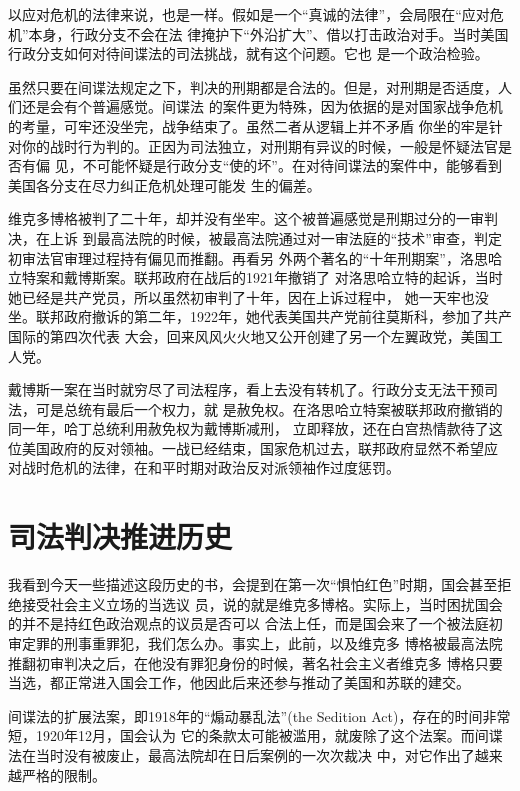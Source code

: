 \documentclass[10pt]{article}
\begin{document}
{以应对危机的法律来说，也是一样。假如是一个``真诚的法律''，会局限在``应对危机''本身，行政分支不会在法
律掩护下``外沿扩大''、借以打击政治对手。当时美国行政分支如何对待间谍法的司法挑战，就有这个问题。它也
是一个政治检验。

虽然只要在间谍法规定之下，判决的刑期都是合法的。但是，对刑期是否适度，人们还是会有个普遍感觉。间谍法
的案件更为特殊，因为依据的是对国家战争危机的考量，可牢还没坐完，战争结束了。虽然二者从逻辑上并不矛盾
\myrule 你坐的牢是针对你的战时行为判的。正因为司法独立，对刑期有异议的时候，一般是怀疑法官是否有偏
见，不可能怀疑是行政分支``使的坏''。在对待间谍法的案件中，能够看到美国各分支在尽力纠正危机处理可能发
生的偏差。

维克多\textperiodcentered 博格被判了二十年，却并没有坐牢。这个被普遍感觉是刑期过分的一审判决，在上诉
到最高法院的时候，被最高法院通过对一审法庭的``技术''审查，判定初审法官审理过程持有偏见而推翻。再看另
外两个著名的``十年刑期案''，洛思\textperiodcentered 哈立特案和戴博斯案。联邦政府在战后的1921年撤销了
对洛思\textperiodcentered 哈立特的起诉，当时她已经是共产党员，所以虽然初审判了十年，因在上诉过程中，
她一天牢也没坐。联邦政府撤诉的第二年，1922年，她代表美国共产党前往莫斯科，参加了共产国际的第四次代表
大会，回来风风火火地又公开创建了另一个左翼政党，美国工人党。

戴博斯一案在当时就穷尽了司法程序，看上去没有转机了。行政分支无法干预司法，可是总统有最后一个权力，就
是赦免权。在洛思\textperiodcentered 哈立特案被联邦政府撤销的同一年，哈丁总统利用赦免权为戴博斯减刑，
立即释放，还在白宫热情款待了这位美国政府的反对领袖。一战已经结束，国家危机过去，联邦政府显然不希望应
对战时危机的法律，在和平时期对政治反对派领袖作过度惩罚。

\pagebreak
\section{司法判决推进历史}

我看到今天一些描述这段历史的书，会提到在第一次``惧怕红色''时期，国会甚至拒绝接受社会主义立场的当选议
员，说的就是维克多\textperiodcentered 博格。实际上，当时困扰国会的并不是持红色政治观点的议员是否可以
合法上任，而是国会来了一个被法庭初审定罪的刑事重罪犯，我们怎么办。事实上，此前，以及维克多
\textperiodcentered 博格被最高法院推翻初审判决之后，在他没有罪犯身份的时候，著名社会主义者维克多
\textperiodcentered 博格只要当选，都正常进入国会工作，他因此后来还参与推动了美国和苏联的建交。

间谍法的扩展法案，即1918年的``煽动暴乱法''(the Sedition Act)，存在的时间非常短，1920年12月，国会认为
它的条款太可能被滥用，就废除了这个法案。而间谍法在当时没有被废止，最高法院却在日后案例的一次次裁决
中，对它作出了越来越严格的限制。

}
\end{document}
